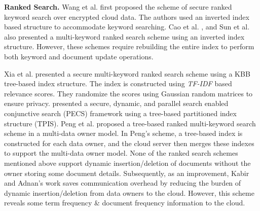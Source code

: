 \documentclass[sigconf,pdftex]{acmart}
\begin{document}
\textbf{Ranked Search.} Wang et al. \cite{wang2010secure, wang2011enabling} first proposed the scheme of secure ranked keyword search over encrypted cloud data. The authors used an inverted index based structure to accommodate keyword searching. Cao et al. \cite{cao2013privacy}, and Sun et al. \cite{sun2013verifiable} also presented a multi-keyword ranked search scheme using an inverted index structure. However, these schemes require rebuilding the entire index to perform both keyword and document update operations.


Xia et al. \cite{xia2015secure} presented a secure multi-keyword ranked search scheme using a KBB tree-based index structure. The index is constructed using \textit{TF-IDF} based relevance scores. They randomize the scores using Gaussian random matrices to ensure privacy. \cite{smithamol2018pecs} presented a secure, dynamic, and parallel search enabled conjunctive search (PECS) framework using a tree-based partitioned index structure (TPIS). Peng et al. \cite{peng2018efficient} proposed a tree-based ranked multi-keyword search scheme in a multi-data owner model. In Peng's scheme, a tree-based index is constructed for each data owner, and the cloud server then merges these indexes to support the multi-data owner model.  None of the ranked search schemes mentioned above support dynamic insertion/deletion of documents without the owner storing some document details. Subsequently, as an improvement, Kabir and Adnan's \cite{kabir2017dynamic} work saves communication overhead by reducing the burden of dynamic insertion/deletion from data owners to the cloud. However, this scheme reveals some term frequency \& document frequency information to the cloud.
\end{document}
